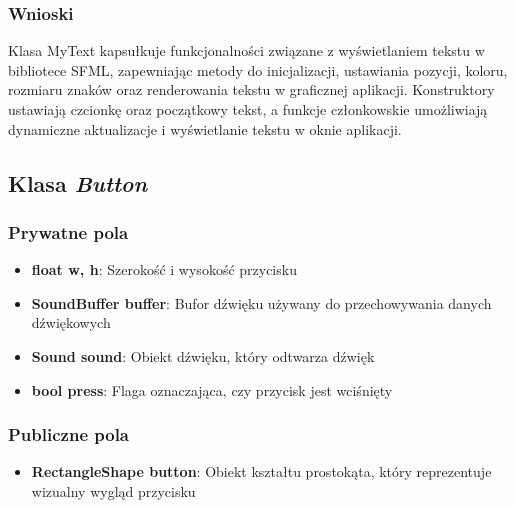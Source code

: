 \documentclass[a4paper, 10pt]{article}
\begin{document}
\subsubsection{Wnioski}
Klasa MyText kapsułkuje funkcjonalności związane z wyświetlaniem tekstu w bibliotece SFML, zapewniając metody do inicjalizacji, ustawiania pozycji, koloru, rozmiaru znaków oraz renderowania tekstu w graficznej aplikacji. Konstruktory ustawiają czcionkę oraz początkowy tekst, a funkcje członkowskie umożliwiają dynamiczne aktualizacje i wyświetlanie tekstu w oknie aplikacji.

\subsection{Klasa \textit{Button}}

\subsubsection{Prywatne pola}
\begin{itemize}
	\item \textbf{float w, h}: Szerokość i wysokość przycisku
	\item \textbf{SoundBuffer buffer}: Bufor dźwięku używany do przechowywania danych dźwiękowych
	\item \textbf{Sound sound}: Obiekt dźwięku, który odtwarza dźwięk
	\item \textbf{bool press}: Flaga oznaczająca, czy przycisk jest wciśnięty
\end{itemize}
\subsubsection{Publiczne pola}
\begin{itemize}
	\item \textbf{RectangleShape button}: Obiekt kształtu prostokąta, który reprezentuje wizualny wygląd przycisku
\end{itemize}
\end{document}
